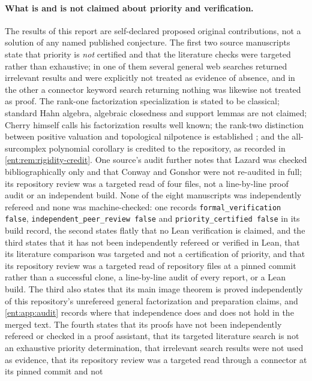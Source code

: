 \documentclass[11pt]{article}
\theoremstyle{plain}
\theoremstyle{plain}
\theoremstyle{plain}
\theoremstyle{definition}
\theoremstyle{definition}
\theoremstyle{definition}
\theoremstyle{definition}
\theoremstyle{remark}
\begin{document}
\paragraph{What is and is not claimed about priority and verification.}
The results of this report are self-declared proposed original contributions,
not a solution of any named published conjecture. The first two source
manuscripts state that priority is \emph{not} certified and that the literature checks
were targeted rather than exhaustive; in one of them several general web
searches returned irrelevant results and were explicitly not treated as
evidence of absence, and in the other a connector keyword search returning
nothing was likewise not treated as proof. The rank-one factorization
specialization is stated to be classical; standard Hahn algebra, algebraic
closedness and support lemmas are not claimed; Cherry himself calls his
factorization results well known; the rank-two distinction between positive
valuation and topological nilpotence is established
\cite[Section~6.2]{Conrad}; and the all-surcomplex polynomial corollary is
credited to the repository, as recorded in \cref{ent:rem:rigidity-credit}.
One source's audit further notes that Lazard was checked bibliographically
only and that Conway and Gonshor were not re-audited in full; its repository
review was a targeted read of four files, not a line-by-line proof audit or
an independent build. None of the eight manuscripts was independently
refereed and none was machine-checked: one records
\texttt{formal\_verification false},
\texttt{independent\_peer\_review false} and \texttt{priority\_certified
false} in its build record, the second states flatly that no Lean
verification is claimed, and the third states that it has not been
independently refereed or verified in Lean, that its literature comparison
was targeted and not a certification of priority, and that its repository
review was a targeted read of repository files at a pinned commit rather than
a successful clone, a line-by-line audit of every report, or a Lean build.
The third also states that its main image theorem is proved independently of
this repository's unrefereed general factorization and preparation claims,
and \cref{ent:app:audit} records where that independence does and does not
hold in the merged text. The fourth states that its proofs have not been
independently refereed or checked in a proof assistant, that its targeted
literature search is not an exhaustive priority determination, that
irrelevant search results were not used as evidence, that its repository
review was a targeted read through a connector at its pinned commit and not
\end{document}

